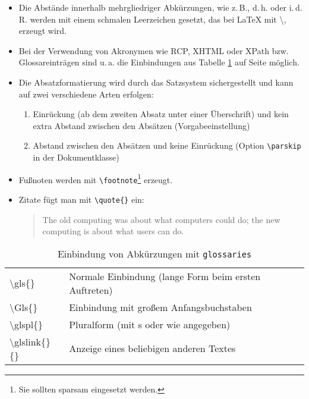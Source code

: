 \begin{itemize}
	\item Die Abstände innerhalb mehrgliedriger Abkürzungen, wie z.\,B., d.\,h. oder i.\,d.\,R. werden mit einem schmalen Leerzeichen gesetzt, das bei \LaTeX{} mit \textbackslash{}, erzeugt wird.
	\item Bei der Verwendung von Akronymen wie \Gls{RCP}, \gls{XHTML} oder \Gls{XPath} bzw. Glossareinträgen sind u.\,a. die Einbindungen aus Tabelle \ref{tab:glossariesusage} auf Seite \pageref{tab:glossariesusage} möglich.
	\item Die Absatzformatierung wird durch das Satzsystem sichergestellt und kann auf zwei verschiedene Arten erfolgen:\begin{enumerate}
		\item Einrückung (ab dem zweiten Absatz unter einer Überschrift) und kein extra Abstand zwischen den Absätzen (Vorgabeeinstellung)
		\item Abstand zwischen den Absätzen und keine Einrückung (Option \texttt{\textbackslash{}parskip} in der Dokumentklasse)
	\end{enumerate}
	\item Fußnoten werden mit \texttt{\textbackslash{}footnote}\footnote{Sie sollten sparsam eingesetzt werden.} erzeugt.
	\item Zitate fügt man mit \texttt{\textbackslash{}quote\{\}} ein: \begin{quote}The old computing was about what computers could do; the new computing is about what users can do.\end{quote}
\end{itemize}

\begin{table}[ht]
\centering
\caption{Einbindung von Abkürzungen mit \texttt{glossaries}}
\label{tab:glossariesusage}
\begin{tabular}{ll} \toprule
\textbackslash{}gls\{\} & Normale Einbindung (lange Form beim ersten Auftreten)\\
\textbackslash{}Gls\{\} & Einbindung mit großem Anfangsbuchstaben\\
\textbackslash{}glspl\{\} & Pluralform (mit s oder wie angegeben)\\
\textbackslash{}glslink\{\}\{\} & Anzeige eines beliebigen anderen Textes\\
\bottomrule
\end{tabular}
\end{table}

